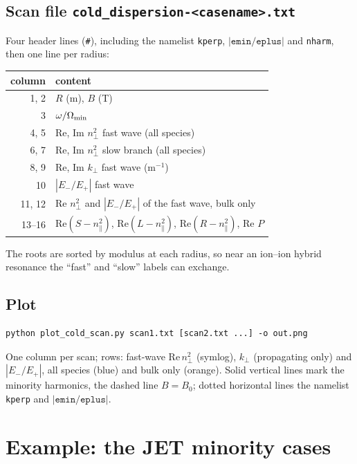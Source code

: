 \documentclass[11pt,a4paper]{article}
\newcommand{\npar}{n_\parallel}
\newcommand{\nperp}{n_\perp}
\newcommand{\code}[1]{\texttt{#1}}
\begin{document}
\subsection{Scan file \code{cold\_dispersion-<casename>.txt}}

Four header lines (\code{\#}), including the namelist \code{kperp},
$|\code{emin}/\code{eplus}|$ and \code{nharm}, then one line per radius:

\begin{tabular}{@{}r l@{}}
\toprule
column & content \\
\midrule
1, 2   & $R$ (m), $B$ (T) \\
3      & $\omega/\Omega_{\rm min}$ \\
4, 5   & Re, Im $\nperp^2$ fast wave (all species) \\
6, 7   & Re, Im $\nperp^2$ slow branch (all species) \\
8, 9   & Re, Im $k_\perp$ fast wave (m$^{-1}$) \\
10     & $|E_-/E_+|$ fast wave \\
11, 12 & Re $\nperp^2$ and $|E_-/E_+|$ of the fast wave, bulk only \\
13--16 & Re$(S-\npar^2)$, Re$(L-\npar^2)$, Re$(R-\npar^2)$, Re $P$ \\
\bottomrule
\end{tabular}

The roots are sorted by modulus at each radius, so near an ion--ion hybrid
resonance the ``fast'' and ``slow'' labels can exchange.

\subsection{Plot}

\begin{lstlisting}
python plot_cold_scan.py scan1.txt [scan2.txt ...] -o out.png
\end{lstlisting}
One column per scan; rows: fast-wave $\mathrm{Re}\,\nperp^2$ (symlog),
$k_\perp$ (propagating only) and $|E_-/E_+|$, all species (blue) and bulk only
(orange). Solid vertical lines mark the minority harmonics, the dashed line
$B=B_0$; dotted horizontal lines the namelist \code{kperp} and
$|\code{emin}/\code{eplus}|$.

\section{Example: the JET minority cases}\label{sec:jet}
\end{document}
